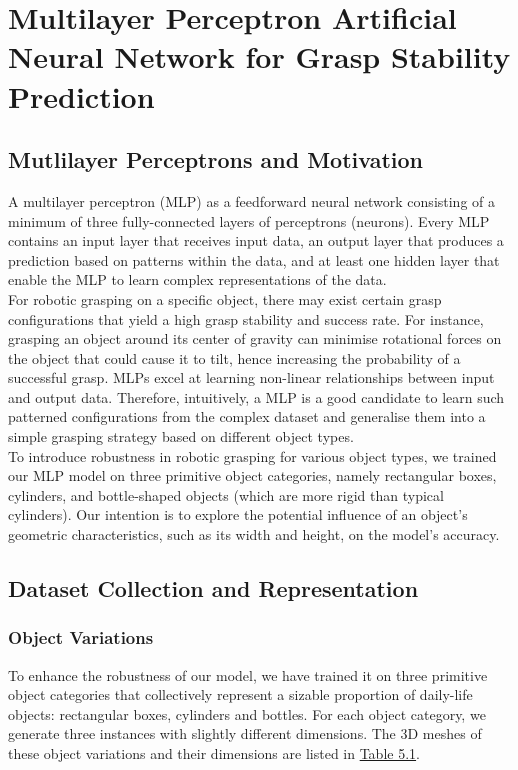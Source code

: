 \documentclass[11pt, a4paper]{report}
\begin{document}
\chapter{Multilayer Perceptron Artificial Neural Network for Grasp Stability Prediction}
\label{chap:5}

\section{Mutlilayer Perceptrons and Motivation}
\label{sec:5.1}
A multilayer perceptron (MLP) as a feedforward neural network consisting of a minimum of three fully-connected layers of perceptrons (neurons). Every MLP contains an input layer that receives input data, an output layer that produces a prediction based on patterns within the data, and at least one hidden layer that enable the MLP to learn complex representations of the data.\\

For robotic grasping on a specific object, there may exist certain grasp configurations that yield a high grasp stability and success rate. For instance, grasping an object around its center of gravity can minimise rotational forces on the object that could cause it to tilt, hence increasing the probability of a successful grasp. MLPs excel at learning non-linear relationships between input and output data. Therefore, intuitively, a MLP is a good candidate to learn such patterned configurations from the complex dataset and generalise them into a simple grasping strategy based on different object types.\\

To introduce robustness in robotic grasping for various object types, we trained our MLP model on three primitive object categories, namely rectangular boxes, cylinders, and bottle-shaped objects (which are more rigid than typical cylinders). Our intention is to explore the potential influence of an object's geometric characteristics, such as its width and height, on the model's accuracy.


\section{Dataset Collection and Representation}
\label{sec:5.2}


\subsection{Object Variations}
\label{sec:5.2.1}
To enhance the robustness of our model, we have trained it on three primitive object categories that collectively represent a sizable proportion of daily-life objects: rectangular boxes, cylinders and bottles. For each object category, we generate three instances with slightly different dimensions. The 3D meshes of these object variations and their dimensions are listed in \hyperref[tbl:5.1]{Table 5.1}.
\end{document}
